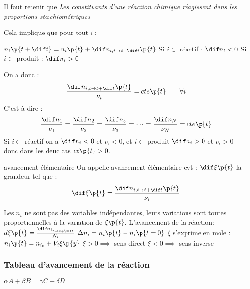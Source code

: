     Il faut retenir que \emph{Les constituants d'une réaction chimique réagissent dans les proportions st\oe{}chiométriques}
    
    Cela implique que pour tout $i$ :
    \begin{enumerate}
        \itt $n_i\p{t + \dif t} = n_i\p{t} + \dif n_{i, t \to t + \dif t}\p{t}$
        \itt Si $i \in $ réactif : $\dif n_i < 0$
        \itt Si $i \in$ produit : $\dif n_i > 0$
    \end{enumerate}
    On a donc :
    \[ \dfrac{\dif n_{i, t \to t + \dif t}\p{t}}{\nu_i} = cte\p{t} \qquad\forall i\]
    C'est-à-dire :
    \[ \dfrac{\dif n_1}{\nu_1} = \dfrac{\dif n_2}{\nu_2} = \dfrac{\dif n_3}{\nu_3} = \dots = \dfrac{\dif n_N}{\nu_N} = cte\p{t}\]
    Si $i \in$ réactif on a $\dif n_i < 0$ et $\nu_i < 0$, et $i \in $ produit $\dif n_i > 0$ et $\nu_i > 0$ donc dans les deuc cas $ce\p{t} > 0$.

    \begin{definition}{avancement élémentaire}{}
        On appelle avancement élémentaire evt : $\dif\xi\p{t}$ la grandeur tel que :
        \[ \dif \xi\p{t} = \dfrac{\dif n_{i, t \to t + \dif t}\p{t}}{\nu_i}\]
        
    \end{definition}
    \begin{enumerate}
        \itt Les $n_i$ ne sont pas des variables indépendantes, leurs variations sont toutes proportionnelles à la variation de $\xi\p{t}$. L'avancement de la réaction: $d\xi\p{t} = \frac{\dif n_{i_{t \to t + \dif t}}}{N_i}$
        $\Delta n_i = n_i\p{t} - n_i\p{t = 0}$
        \itt $\xi$ s'exprime en mole : $n_i\p{t} = n_{i_0} + V_i\xi\p{y}$
        \itt $\xi > 0 \implies$ sens direct
        \itt $\xi < 0 \implies$ sens inverse
    \end{enumerate}
    \subsubsection{Tableau d'avancement de la réaction} 
    
    \begin{example}{}{}
        $\alpha A + \beta B = \gamma C + \delta D$
    \end{example}

